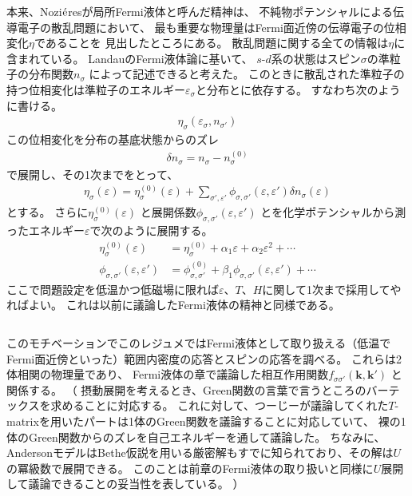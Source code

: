\documentclass[a4j]{jarticle}
\begin{document}
本来、Nozi$\acute{\rm e}$resが局所Fermi液体と呼んだ精神は、
不純物ポテンシャルによる伝導電子の散乱問題において、
最も重要な物理量はFermi面近傍の伝導電子の位相変化$\eta$であることを
見出したところにある。
散乱問題に関する全ての情報は$\eta$に含まれている。
LandauのFermi液体論に基いて、
$s$-$d$系の状態はスピン$\sigma$の準粒子の分布関数$n_{\sigma}$
によって記述できると考えた。
このときに散乱された準粒子の持つ位相変化は準粒子のエネルギー$\varepsilon_{\sigma}$と分布とに依存する。
すなわち次のように書ける。
\begin{align}
	\eta_{\sigma}(\varepsilon_{\sigma} , n_{\sigma'})
\end{align}
この位相変化を分布の基底状態からのズレ
\begin{align}
	\delta n_{\sigma} = n_{\sigma} - n_{\sigma}^{(0)}
\end{align}
で展開し、その1次までをとって、
\begin{align}
	\eta_{\sigma}(\varepsilon)
	=
	\eta_{\sigma}^{(0)}(\varepsilon)
	+
	\sum_{\sigma',\varepsilon'}
	\phi_{\sigma,\sigma'}(\varepsilon,\varepsilon')
	\delta n_{\sigma}(\varepsilon)
\end{align}
とする。
さらに$\eta_{\sigma}^{(0)}(\varepsilon)$
と展開係数$\phi_{\sigma,\sigma'}(\varepsilon,\varepsilon')$
とを化学ポテンシャルから測ったエネルギー$\varepsilon$で次のように展開する。
\begin{align}
	\eta_{\sigma}^{(0)}(\varepsilon)
	 & =
	\eta_{\sigma}^{(0)}
	+
	\alpha_{1} \varepsilon
	+
	\alpha_{2} \varepsilon^{2}
	+
	\cdots
	\\
	\phi_{\sigma,\sigma'}(\varepsilon,\varepsilon')
	 & =
	\phi_{\sigma,\sigma'}^{(0)}
	+
	\beta_{1}
	\phi_{\sigma,\sigma'}(\varepsilon,\varepsilon')
	+
	\cdots
\end{align}
ここで問題設定を低温かつ低磁場に限れば$\varepsilon$、$T$、$H$に関して1次まで採用してやればよい。
これは以前に議論したFermi液体の精神と同様である。


${}$

このモチベーションでこのレジュメではFermi液体として取り扱える（低温でFermi面近傍といった）範囲内密度の応答とスピンの応答を調べる。
これらは2体相関の物理量であり、
Fermi液体の章で議論した相互作用関数$f_{\sigma\sigma'}(\bm{k},\bm{k}')$
と関係する。
（
摂動展開を考えるとき、Green関数の言葉で言うところのバーテックスを求めることに対応する。
これに対して、つーじーが議論してくれた$T$-matrixを用いたパートは1体のGreen関数を議論することに対応していて、
裸の1体のGreen関数からのズレを自己エネルギーを通して議論した。
ちなみに、AndersonモデルはBethe仮説を用いる厳密解もすでに知られており、その解は$U$の冪級数で展開できる。
このことは前章のFermi液体の取り扱いと同様に$U$展開して議論できることの妥当性を表している。
）
\end{document}
